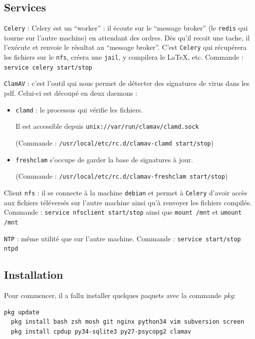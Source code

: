 \documentclass[10pt,a4paper]{article}
\begin{document}
\subsection{Services}

\texttt{Celery} : Celery est un ``worker'' : il écoute sur le ``message broker'' (le \texttt{redis} qui tourne sur l'autre machine) en attendant des ordres.
Dès qu'il recoit une tache, il l'exécute et renvoie le résultat au ``message broker''.
C'est \texttt{Celery} qui récupérera les fichiers sur le \texttt{nfs}, créera une \texttt{jail}, y compilera le \LaTeX, etc.
Commande : \texttt{service celery start/stop}

\texttt{ClamAV} : c'est l'outil qui nous permet de détecter des signatures de virus dans les pdf.
Celui-ci est découpé en deux daemons :
        \begin{itemize}
            \item \texttt{clamd} : le processus qui vérifie les fichiers.

            Il est accessible depuis \texttt{unix://var/run/clamav/clamd.sock}

            (Commande : \texttt{/usr/local/etc/rc.d/clamav-clamd start/stop})
            \item \texttt{freshclam} s'occupe de garder la base de signatures à jour.

            (Commande : \texttt{/usr/local/etc/rc.d/clamav-freshclam start/stop})
        \end{itemize}

\vspace{1em} %
Client \texttt{nfs} : il se connecte à la machine \texttt{debian} et permet à \texttt{Celery} d'avoir accès aux fichiers téléversés sur l'autre machine ainsi qu'à renvoyer les fichiers compilés.
Commande : \texttt{service nfsclient start/stop} ainsi que \texttt{mount /mnt} et \texttt{umount /mnt}

\texttt{NTP} : même utilité que sur l'autre machine.
Commande : \texttt{service start/stop ntpd}

\subsection{Installation}
Pour commencer, il a fallu installer quelques paquets avec la commande \emph{pkg}:
\begin{lstlisting}[language=bash]
  pkg update
  pkg install bash zsh mosh git nginx python34 vim subversion screen
  pkg install cpdup py34-sqlite3 py27-psycopg2 clamav
\end{lstlisting}
\end{document}

